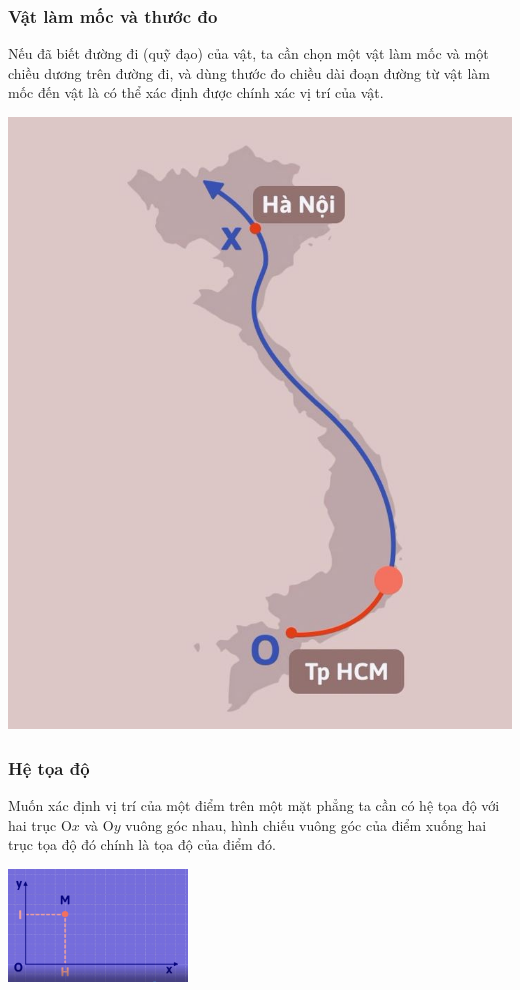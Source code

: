 \subsubsection{Vật làm mốc và thước đo}
Nếu đã biết đường đi (quỹ đạo) của vật, ta cần chọn một vật làm mốc và một chiều dương trên đường đi, và dùng thước đo chiều dài đoạn đường từ vật làm mốc đến vật là có thể xác định được chính xác vị trí của vật.
\begin{center}
	\includegraphics[scale=0.3]{../figs/VN10-PH-02-L-001-1-V2-01.jpg}
\end{center}
\subsubsection{Hệ tọa độ}
Muốn xác định vị trí của một điểm trên một mặt phẳng ta cần có hệ tọa độ với hai trục O$x$ và O$y$ vuông góc nhau, hình chiếu vuông góc của điểm xuống hai trục tọa độ đó chính là tọa độ của điểm đó.
\begin{center}
	\includegraphics[height=3cm]{../figs/VN10-PH-02-L-001-1-V2-02.jpg}
	
\end{center}
